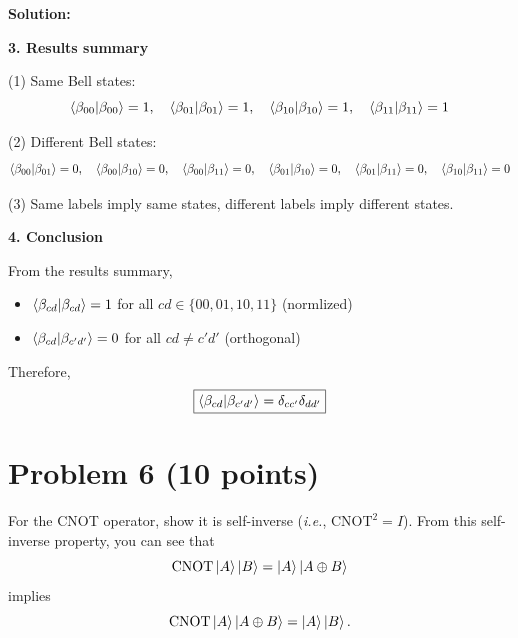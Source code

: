 \documentclass[11pt]{article}
\newenvironment{solution}
{\par\noindent\textbf{Solution:}\par}
{\vspace{1em}}
\begin{document}
\begin{solution}
\textbf{3. Results summary}

(1) Same Bell states:
\[\braket{\beta_{00}}{\beta_{00}} = 1, \quad \braket{\beta_{01}}{\beta_{01}} = 1, \quad \braket{\beta_{10}}{\beta_{10}} = 1, \quad \braket{\beta_{11}}{\beta_{11}} = 1\]

(2) Different Bell states:
\[\braket{\beta_{00}}{\beta_{01}} = 0, \quad \braket{\beta_{00}}{\beta_{10}} = 0, \quad \braket{\beta_{00}}{\beta_{11}} = 0, \quad \braket{\beta_{01}}{\beta_{10}} = 0, \quad \braket{\beta_{01}}{\beta_{11}} = 0, \quad \braket{\beta_{10}}{\beta_{11}} = 0\]

(3) Same labels imply same states, different labels imply different states.

\textbf{4. Conclusion}

From the results summary,
\begin{itemize}
    \item $\braket{\beta_{cd}}{\beta_{cd}} = 1$ for all $cd \in \{00, 01, 10, 11\}$ (normlized)
    \item $\braket{\beta_{cd}}{\beta_{c'd'}} = 0$ for all $cd \neq c'd'$ (orthogonal)
\end{itemize}

Therefore,
\[\boxed{\braket{\beta_{cd}}{\beta_{c'd'}} = \delta_{cc'}\delta_{dd'}}\]

\end{solution}

\section*{Problem 6 (10 points)}
For the CNOT operator, show it is self-inverse (\textit{i.e.}, $\text{CNOT}^2 = I$). From this self-inverse property, you can see that
\[
\text{CNOT}\ket{A}\ket{B}=\ket{A}\ket{A\oplus B}
\]
implies
\[
\text{CNOT}\ket{A}\ket{A\oplus B}=\ket{A}\ket{B}.
\]
\end{document}
